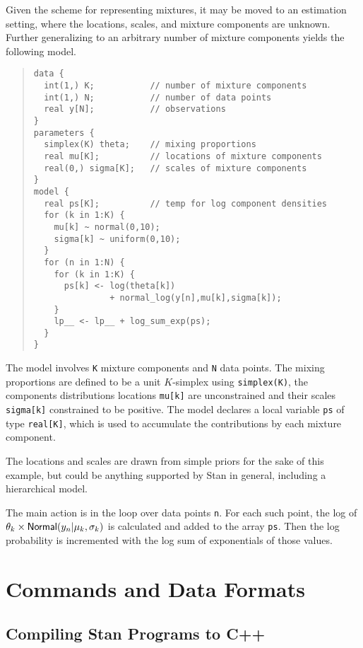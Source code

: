 \documentclass[10pt]{report}
\newcommand{\Stan}{Stan\xspace}
\newcommand{\code}[1]{{\tt #1}}
\newcommand{\distro}[1]{\mbox{\sf #1}}
\begin{document}
Given the scheme for representing mixtures, it may be moved to an
estimation setting, where the locations, scales, and mixture
components are unknown.  Further generalizing to an arbitrary number
of mixture components yields the following model.
%
\begin{quote}
\begin{Verbatim}
data {
  int(1,) K;           // number of mixture components
  int(1,) N;           // number of data points
  real y[N];           // observations
}
parameters {
  simplex(K) theta;    // mixing proportions
  real mu[K];          // locations of mixture components
  real(0,) sigma[K];   // scales of mixture components
}
model {
  real ps[K];          // temp for log component densities
  for (k in 1:K) {
    mu[k] ~ normal(0,10);
    sigma[k] ~ uniform(0,10);
  }
  for (n in 1:N) {
    for (k in 1:K) {
      ps[k] <- log(theta[k]) 
               + normal_log(y[n],mu[k],sigma[k]);
    }
    lp__ <- lp__ + log_sum_exp(ps);    
  }
}
\end{Verbatim}
\end{quote}
%
The model involves \code{K} mixture components and \code{N} data
points.  The mixing proportions are defined to be a unit $K$-simplex
using \code{simplex(K)}, the components distributions locations
\code{mu[k]} are unconstrained and their scales \code{sigma[k]}
constrained to be positive.  The model declares a local variable
\code{ps} of type \code{real[K]}, which is used to accumulate the
contributions by each mixture component.

The locations and scales are drawn from simple priors for the sake of
this example, but could be anything supported by \Stan in general,
including a hierarchical model.  

The main action is in the loop over data points \code{n}.  For each
such point, the log of $\theta_k \times
\distro{Normal}(y_n|\mu_k,\sigma_k)$ is calculated and added to the
array \code{ps}.  Then the log probability is incremented with the log
sum of exponentials of those values.







\part{Commands and Data Formats}


\chapter{Compiling \Stan Programs 
to C++}\label{stanc.chapter}
\end{document}
